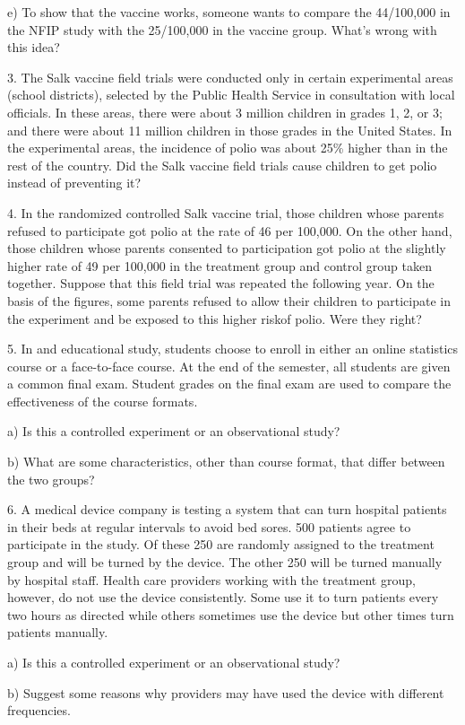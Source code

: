 \documentclass[10pt]{article}
\begin{document}
\hspace{10pt} e) To show that the vaccine works, someone wants to compare the 44/100,000 in the
NFIP study with the 25/100,000 in the vaccine group.  What's wrong with this idea?
\vspace{.6in}

3. The Salk vaccine field trials were conducted only in certain experimental areas (school districts),
selected by the Public Health Service in consultation with local officials.  
In these areas, there were about 3 million children in grades 1, 2, or 3; and there were about 
11 million children in those grades in the United States.  In the experimental areas,
the incidence of polio was about 25\% higher than in the rest of the country.  Did the Salk
vaccine field trials cause children to get polio instead of preventing it?  
\vspace{1in}

4. In the randomized controlled Salk vaccine trial, those children whose parents refused to 
participate got polio at the rate of 46 per 100,000.  On the other hand, those children whose
parents consented to participation got polio at the slightly higher rate of 49 per 100,000
in the treatment group and control group taken together.  
Suppose that this field trial was repeated the following year.  On the basis of the figures, some parents
refused to allow their children to participate in the experiment and be exposed to this higher riskof polio.
Were they right?
\vspace{1in}

5. In and educational study, students choose to enroll in either an online statistics course or a face-to-face
course.  At the end of the semester, all students are given a common final exam. Student grades on the final 
exam are used to compare the effectiveness of the course formats.

\hspace{10pt} a) Is this a controlled experiment or an observational study?
\vspace{.3in}


\hspace{10pt} b) What are some characteristics, other than course format, that differ between the two 
groups?
\vspace{.5in}

6. A medical device company is testing a system that can turn hospital patients in their beds at regular intervals
to avoid bed sores.  500 patients agree to participate in the study.  Of these 250 are randomly assigned
to the treatment group and will be turned by the device.  The other 250 will be turned manually by hospital 
staff.  Health care providers working with the treatment group, however, do not use the device consistently.
Some use it to turn patients every two hours as directed while others sometimes use the device but other times
turn patients manually.  

\hspace{10pt} a) Is this a controlled experiment or an observational study?
\vspace{.3in}

\hspace{10pt} b) Suggest some reasons why providers may have used the device with different frequencies.
\vfill
\eject
\end{document}
